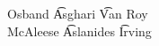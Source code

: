 \documentclass[preview]{standalone}
\begin{document}
\begin{center}
Osband \t Asghari \t Van Roy \\ McAleese \t Aslanides \t Irving
\end{center}
\end{document}
